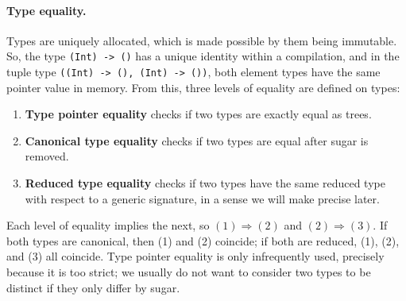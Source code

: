 \documentclass[../generics]{subfiles}
\begin{document}
\paragraph{Type equality.} Types are uniquely allocated, which is made possible by them being immutable. So, the type \texttt{(Int) -> ()} has a unique identity within a compilation, and in the tuple type \texttt{((Int) -> (), (Int) -> ())}, both element types have the same pointer value in memory. From this, three levels of equality are defined on types:
\begin{enumerate}
\item {}\textbf{Type pointer equality} checks if two types are exactly equal as trees.
\item {}\textbf{Canonical type equality} checks if two types are equal after sugar is removed.
\item {}\textbf{Reduced type equality} checks if two types have the same reduced type with respect to a generic signature, in a sense we will make precise later.
\end{enumerate}
Each level of equality implies the next, so $(1)\Rightarrow(2)$ and $(2)\Rightarrow(3)$. If both types are canonical, then (1) and (2) coincide; if both are reduced, (1), (2), and (3) all coincide. Type pointer equality is only infrequently used, precisely because it is too strict; we usually do not want to consider two types to be distinct if they only differ by sugar.
\end{document}
